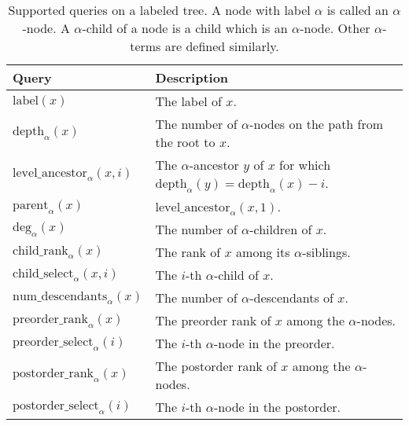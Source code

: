 \documentclass[12pt]{article}
\newcommand{\Labelb}{\mathrm{label}}
\newcommand{\depthb}{\mathrm{depth}}
\newcommand{\parentb}{\mathrm{parent}}
\newcommand{\levelancestorb}{\mathrm{level\_ancestor}}
\newcommand{\Degb}{\mathrm{deg}}
\newcommand{\childrankb}{\mathrm{child\_rank}}
\newcommand{\childselectb}{\mathrm{child\_select}}
\newcommand{\numdescendantsb}{\mathrm{num\_descendants}}
\newcommand{\preorderrankb}{\mathrm{preorder\_rank}}
\newcommand{\preorderselectb}{\mathrm{preorder\_select}}
\newcommand{\postorderrankb}{\mathrm{postorder\_rank}}
\newcommand{\postorderselectb}{\mathrm{postorder\_select}}
\newcommand{\Label}[1]{\Labelb(#1)}
\newcommand{\depth}[2]{\depthb_{#1}(#2)}
\newcommand{\parent}[2]{\parentb_{#1}(#2)}
\newcommand{\levelancestor}[3]{\levelancestorb_{#1}(#2,#3)}
\newcommand{\Deg}[2]{\Degb_{#1}(#2)}
\newcommand{\childrank}[2]{\childrankb_{#1}(#2)}
\newcommand{\childselect}[3]{\childselectb_{#1}(#2,#3)}
\newcommand{\numdescendants}[2]{\numdescendantsb_{#1}(#2)}
\newcommand{\preorderrank}[2]{\preorderrankb_{#1}(#2)}
\newcommand{\preorderselect}[2]{\preorderselectb_{#1}(#2)}
\newcommand{\postorderrank}[2]{\postorderrankb_{#1}(#2)}
\newcommand{\postorderselect}[2]{\postorderselectb_{#1}(#2)}
\begin{document}
\begin{table}
\caption{Supported queries on a labeled tree.
A node with label $\alpha$ is called an $\alpha$-node.
A $\alpha$-child of a node is a child which is an $\alpha$-node.
Other $\alpha$- terms are defined similarly.
\label{tab:labeled-queries}}
\centering
\begin{tabular}{lp{11.4cm}}
\toprule
Query & Description \\
\midrule
$\Label{x}$ & The label of $x$. \\
$\depth{\alpha}{x}$ & The number of $\alpha$-nodes on the path from
						the root to $x$. \\
$\levelancestor{\alpha}{x}{i}$ & The $\alpha$-ancestor $y$ of $x$ for which
						$\depth{\alpha}{y} = \depth{\alpha}{x}-i$. \\
$\parent{\alpha}{x}$ & $\levelancestor{\alpha}{x}{1}$. \\
$\Deg{\alpha}{x}$ & The number of $\alpha$-children of $x$. \\
$\childrank{\alpha}{x}$ & The rank of $x$ among its $\alpha$-siblings. \\
$\childselect{\alpha}{x}{i}$ & The $i$-th $\alpha$-child of $x$. \\
$\numdescendants{\alpha}{x}$ & The number of $\alpha$-descendants of $x$. \\
$\preorderrank{\alpha}{x}$ & The preorder rank of $x$ among
the $\alpha$-nodes. \\
$\preorderselect{\alpha}{i}$ & The $i$-th $\alpha$-node in the preorder. \\
$\postorderrank{\alpha}{x}$ & The postorder rank of $x$ among
the $\alpha$-nodes. \\
$\postorderselect{\alpha}{i}$ & The $i$-th $\alpha$-node in the postorder. \\
\bottomrule
\end{tabular}
\end{table}
\end{document}
